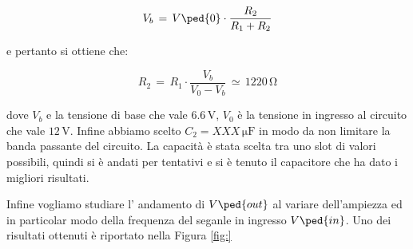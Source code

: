 \begin{equation}
        V_b\,=\,V\ped{0}\cdot\frac{R_2}{R_1+R_2}
\end{equation}

e pertanto si ottiene che:

\begin{equation}
        R_2\,=\,R_1\cdot\frac{V_b}{V_0-V_b} \,\simeq\, 1220\,\si{\ohm}
\end{equation}

dove $V_b$ e la tensione di base che vale $6.6\,\si{\volt}$, $V_0$ è la tensione in ingresso al circuito che vale $12\,\si{\volt}$.
Infine abbiamo scelto $C_2=XXX\,\si{\micro\farad}$ in modo da non limitare la banda passante del circuito. La capacità è stata scelta tra uno slot di valori possibili, quindi si è andati per tentativi e si è tenuto il capacitore che ha dato i migliori risultati.

Infine vogliamo studiare l' andamento di $V\ped{out}$ al variare dell'ampiezza ed in particolar modo della frequenza del seganle in ingresso $V\ped{in}$. Uno dei risultati ottenuti è riportato nella Figura \ref{fig:}
